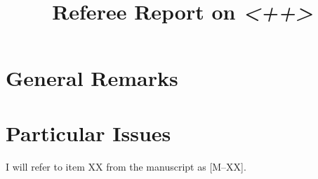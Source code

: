 \documentclass[a4paper,10pt]{article}
\title{Referee Report on \emph{<++>}}
\newcommand{\mscite}[1]{[M--#1]}
\begin{document}
\maketitle
% 

\section{General Remarks}
\section{Particular Issues}
I will refer to item XX from the manuscript as \mscite{XX}.

% 
% 
\end{document}
